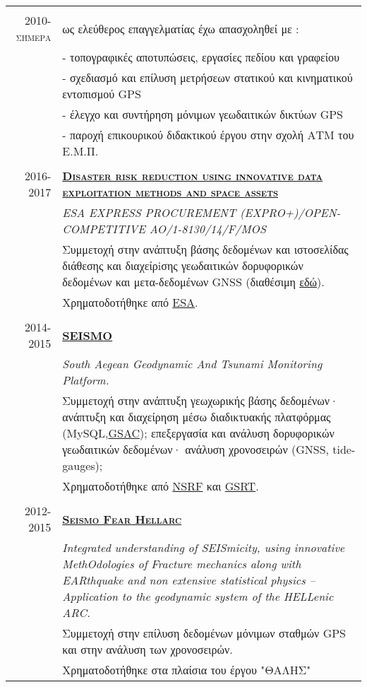 \documentclass[a4paper,10pt]{article} %
\begin{document}
\begin{longtable}{r|p{13cm}}

\multicolumn{2}{c}{} \\
\textsc{2010-σήμερα} & ως ελεύθερος επαγγελματίας έχω απασχοληθεί με :\\ 
  & - τοπογραφικές αποτυπώσεις, εργασίες πεδίου και γραφείου \\
  & - σχεδιασμό και επίλυση μετρήσεων στατικού και κινηματικού εντοπισμού GPS\\
  & - έλεγχο και συντήρηση μόνιμων γεωδαιτικών δικτύων GPS\\
  & - παροχή επικουρικού διδακτικού έργου στην σχολή ΑΤΜ του Ε.Μ.Π. \\

\multicolumn{2}{c}{} \\
\textsc{2016-2017} & \textbf{\textsc{\href{http://www.astro.noa.gr/gr/research/projects/esa/}{Disaster risk reduction using innovative data exploitation methods and space assets}}}\\
  & \textit{\small ESA EXPRESS PROCUREMENT (EXPRO+)/OPEN-COMPETITIVE AO/1-8130/14/F/MOS}\\
  & Συμμετοχή στην ανάπτυξη βάσης δεδομένων και ιστοσελίδας διάθεσης και διαχείρiσης γεωδαιτικών δορυφορικών δεδομένων και μετα-δεδομένων GNSS (διαθέσιμη \href{http://ddrgsac.noa-gsp.terradue.com/ddrgsac}{εδώ}).\\
  & Χρηματοδοτήθηκε από \href{http://www.esa.int/ESA}{ESA}.\\

\multicolumn{2}{c}{} \\
\textsc{2014-2015} & \textbf{\textsc{\href{http://dionysos.survey.ntua.gr/SEISMO/index.html}{SEISMO}}}\\
  & \textit{South Aegean Geodynamic And Tsunami Monitoring Platform.}\\
  & Συμμετοχή στην ανάπτυξη γεωχωρικής βάσης δεδομένων· ανάπτυξη και διαχείρηση μέσω διαδικτυακής πλατφόρμας (MySQL,\href{http://www.unavco.org/software/data-management/gsac/gsac.html}{GSAC});
    επεξεργασία και ανάλυση δορυφορικών γεωδαιτικών δεδομένων· ανάλυση χρονοσειρών (GNSS, tide-gauges); \\
  & Χρηματοδοτήθηκε από \href{http://www.espa.gr/en/Pages/Default.aspx}{NSRF} και \href{http://www.gsrt.gr/central.aspx?sId=119I428I1089I323I488743}{GSRT}.\\

\multicolumn{2}{c}{} \\
\textsc{2012-2015} & \textbf{\textsc{\href{http://excellence.minedu.gov.gr/thales/en/thalesprojects/380208}{Seismo Fear Hellarc}}}\\
  & \textit{Integrated understanding of SEISmicity, using innovative MethOdologies of Fracture mechanics along with EARthquake and non extensive statistical physics – Application to the geodynamic system of the HELLenic ARC.}\\
  & Συμμετοχή στην επίλυση δεδομένων μόνιμων σταθμών GPS και στην ανάλυση των χρονοσειρών.\\
  & Χρηματοδοτήθηκε στα πλαίσια του έργου "ΘΑΛΗΣ"\\


\end{longtable}
\end{document}
